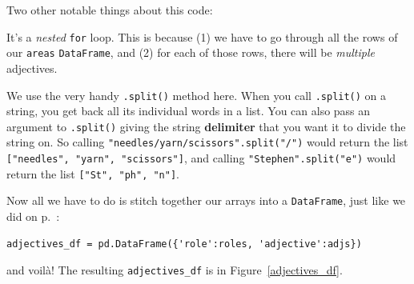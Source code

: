 \pagebreak
Two other notable things about this code:

\begin{compactitem}


\item It's a \textit{nested} \texttt{for} loop. This is because (1) we have to
go through all the rows of our \texttt{areas} \texttt{DataFrame}, and (2) for
each of those rows, there will be \textit{multiple} adjectives.


\item We use the very handy \texttt{.split()} method here. When you call
\texttt{.split()} on a string, you get back all its individual words in a
list. You can also pass an argument to \texttt{.split()} giving the
string \textbf{delimiter} that you want it to divide the string on. So calling
\texttt{"needles/yarn/scissors".split("/")} would return the list
\texttt{["needles", "yarn", "scissors"]}, and calling
\texttt{"Stephen".split("e")} would return the list \texttt{["St", "ph",
"n"]}.

\end{compactitem}


Now all we have to do is stitch together our arrays into a \texttt{DataFrame},
just like we did on p.~\pageref{stitching}:


\begin{Verbatim}[fontsize=\footnotesize,samepage=true,frame=single,framesep=3mm]
adjectives_df = pd.DataFrame({'role':roles, 'adjective':adjs})
\end{Verbatim}
\vspace{-.2in}

and voil\`{a}! The resulting \texttt{adjectives\_df} is in
Figure~\ref{adjectives_df}.

